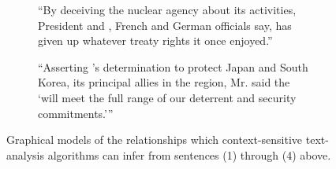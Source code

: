 \begin{figure}[ht!]
\begin{subfigure}[t]{0.45\textwidth}
		\caption{``By deceiving the nuclear agency about its activities, President  and , French and German officials say,  has given up whatever treaty rights it once enjoyed.''}
		\label{fig:nytimes-pgm3}
	\end{subfigure}
	\hfill
	\begin{subfigure}[t]{0.45\textwidth}
		\centering
			\caption{``Asserting 's determination to protect Japan and South Korea, its principal allies in the region, Mr.  said the  `will meet the full range of our deterrent and security commitments.'{}''}
			\label{fig:nytimes-pgm4}
	\end{subfigure}
	\caption{Graphical models of the relationships which context-sensitive text-analysis algorithms can infer from sentences (1) through (4) above.}
	\label{fig:nytimes-pgm14}
\end{figure}

